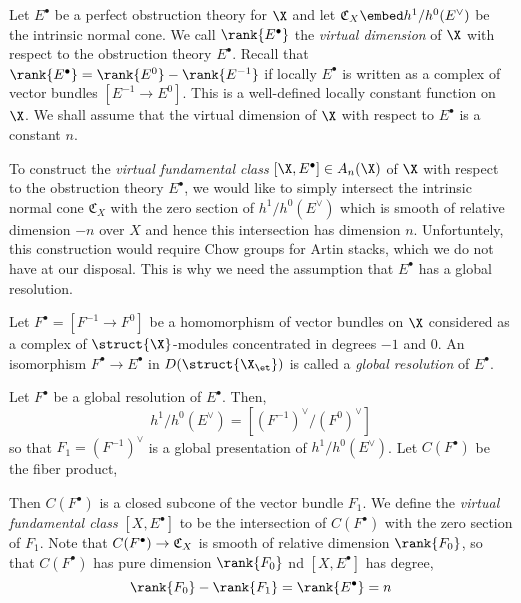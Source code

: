 \documentclass[12pt]{article}
\begin{document}
Let $E^\bullet$ be a perfect obstruction theory for $\X$ and let $\fC_X \embed h^1/h^0(E^\vee)$ be the intrinsic normal cone. We call $\rank{E^\bullet}$ the \textit{virtual dimension} of $\X$ with respect to the obstruction theory $E^\bullet$. Recall that $\rank{E^\bullet} = \rank{E^0} - \rank{E^{-1}}$ if locally $E^\bullet$ is written as a complex of vector bundles $[E^{-1} \to E^0]$. This is a well-defined locally constant function on $\X$. We shall assume that the virtual dimension of $\X$ with respect to $E^\bullet$ is a constant $n$.
\par 
To construct the \textit{virtual fundamental class} $[\X, E^\bullet] \in A_n(\X)$ of $\X$ with respect to the obstruction theory $E^\bullet$, we would like to simply intersect the intrinsic normal cone $\mathfrak{C}_X$ with the zero section of $h^1/h^0(E^\vee)$ which is smooth of relative dimension $-n$ over $X$ and hence this intersection has dimension $n$. Unfortuntely, this construction would require Chow groups for Artin stacks, which we do not have at our disposal. This is why we need the assumption that $E^\bullet$ has a global resolution.

\begin{defn}
Let $F^\bullet = [F^{-1} \to F^0]$ be a homomorphism of vector bundles on $\X$ considered as a complex of $\struct{\X}$-modules concentrated in degrees $-1$ and $0$. An isomorphism $F^\bullet \to E^\bullet$ in $D(\struct{\X_{\et}})$ is called a \textit{global resolution} of $E^\bullet$.
\end{defn}

Let $F^\bullet$ be a global resolution of $E^\bullet$. Then,
\[ h^1/h^0(E^\vee) = [(F^{-1})^\vee / (F^0)^\vee] \]
so that $F_1 = (F^{-1})^\vee$ is a global presentation of $h^1/h^0(E^\vee)$. Let $C(F^\bullet)$ be the fiber product,
\begin{center}
\end{center}
Then $C(F^\bullet)$ is a closed subcone of the vector bundle $F_1$. We define the \textit{virtual fundamental class} $[X, E^\bullet]$ to be the intersection of $C(F^\bullet)$ with the zero section of $F_1$. Note that $C(F^\bullet) \to \mathfrak{C}_X$ is smooth of relative dimension $\rank{F_0}$, so that $C(F^\bullet)$ has pure dimension $\rank{F_0}$ nd $[X, E^\bullet]$ has degree,
\[ \rank{F_0} - \rank{F_1} = \rank{E^\bullet} = n \]
\end{document}

